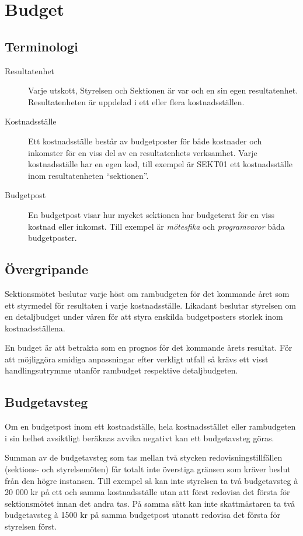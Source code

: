 \documentclass{dsekprotokoll}
\begin{document}
\section{Budget}

\subsection{Terminologi}

\begin{description}
  \item[Resultatenhet] Varje utskott, Styrelsen och Sektionen är var och en sin
    egen resultatenhet. Resultatenheten är uppdelad i ett eller flera
    kostnadsställen.
  \item[Kostnadsställe] Ett kostnadsställe består av budgetposter för både
    kostnader och inkomster för en viss del av en resultatenhets
    verksamhet. Varje kostnadsställe har en egen kod, till exempel är SEKT01 ett
    kostnadsställe inom resultatenheten ``sektionen''.
  \item[Budgetpost] En budgetpost visar hur mycket sektionen har budgeterat för
    en viss kostnad eller inkomst. Till exempel är \textit{mötesfika} och
    \textit{programvaror} båda budgetposter.
\end{description}

\subsection{Övergripande}
Sektionsmötet beslutar varje höst om rambudgeten för det kommande året som ett
styrmedel för resultaten i varje kostnadsställe. Likadant beslutar styrelsen
om en detaljbudget under våren för att styra enskilda budgetposters storlek inom
kostnadsställena.

En budget är att betrakta som en prognos för det kommande årets resultat. För
att möjliggöra smidiga anpassningar efter verkligt utfall så krävs ett visst
handlingsutrymme utanför rambudget respektive detaljbudgeten.

\subsection{Budgetavsteg}
Om en budgetpost inom ett kostnadställe, hela kostnadsstället eller rambudgeten
i sin helhet avsiktligt beräknas avvika negativt kan ett budgetavsteg göras.

Summan av de budgetavsteg som tas mellan två stycken redovisningstillfällen
(sektions- och styrelsemöten) får totalt inte överstiga gränsen som kräver
beslut från den högre instansen.  Till exempel så kan inte styrelsen ta två
budgetavsteg à 20 000 kr på ett och samma kostnadsställe utan att först redovisa
det första för sektionsmötet innan det andra tas.  På samma sätt kan inte
skattmästaren ta två budgetavsteg à 1500 kr på samma budgetpost utanatt redovisa
det första för styrelsen först.
\end{document}
